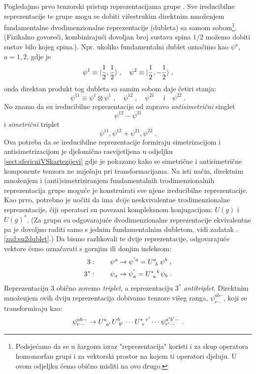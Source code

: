 Pogledajmo prvo tenzorski pristup reprezentacijama grupe .
Sve ireducibilne reprezentacije te grupe mogu se dobiti
višestrukim direktnim množenjem fundamentalne dvodimenzionalne reprezentacije
(dubleta) sa samom sobom\footnote{Podsjećamo da se u žargonu izraz
    "reprezentacija" koristi i za skup operatora homomorfan grupi i za vektorski prostor
    na kojem ti operatori djeluju. U ovom odjeljku ćemo obično
misliti na ovo drugo.}. (Fizikalno govoreći, kombinirajući dovoljan broj
sustava spina $1/2$ možemo dobiti sustav bilo kojeg spina.). Npr. ukoliko
fundamentalni dublet označimo kao
$\psi^a$, $a=1,2$, gdje je 
\begin{displaymath}
 \psi^1 \equiv | \frac{1}{2},\frac{1}{2} \rangle \;, \quad \psi^2
\equiv | \frac{1}{2}, -\frac{1}{2} \rangle \;,
\end{displaymath}
onda direktan produkt tog dubleta sa samim sobom daje četiri stanja:
\begin{displaymath}
 \psi^{11}\equiv \psi^1 \otimes \psi^1 \;, \quad \psi^{12} \;, \quad \psi^{21} \;
 \quad \text{i} \quad \psi^{22} \;.
\end{displaymath}
No znamo da su ireducibilne reprezentacije od  zapravo 
\emph{antisimetrični} singlet
\begin{displaymath}
   \psi^{12} - \psi^{21}
\end{displaymath}
i \emph{simetrični} triplet
\begin{displaymath}
 \psi^{11},  \psi^{12} + \psi^{21}, \psi^{22} \;.
\end{displaymath}
Ova potreba da se ireducibilne reprezentacije formiraju 
simetrizacijom i antisimetrizacijom je djelomično rasvijetljena
u odjeljku \ref{sect:sfericniVSkartezijevi} gdje je pokazano 
kako se simetrične i antisimetrične komponente 
tenzora ne miješaju pri transformacijama.
Na isti način, direktnim množenjem i (anti)simetriziranjem
fundamentalnih trodimenzionalnih reprezentacija grupe  moguće
je konstruirati sve njene ireducibilne reprezentacije. Kao prvo, potrebno je uočiti da
 ima \emph{dvije} neekvivalentne trodimenzionalne reprezentacije,
čiji operatori su povezani kompleksnom konjugacijom: $U(g)$ i
$U(g)^*$. (Za  grupu su odgovarajuće dvodimenzionalne reprezentacije ekvivalentne
pa je dovoljno raditi samo s jednim fundamentalnim dubletom, vidi
zadatak \thechapter.\ref{zad:su2dublet}.)
Da bismo razlikovali te dvije reprezentacije, odgovarajuće vektore
ćemo označavati s gornjim ili donjim indeksom:
\begin{align}
 3&: \qquad  \psi^a \to \psi^{'a} = \tensor{U}{^a_b} \, \psi^{b} \;, \\
 3^*&: \qquad  \psi_a \to \psi^{'}_a = \tensor{U}{^*_a^b} \, \psi_{b} \;.
\label{eq:su3fundamental}
\end{align}
Reprezentaciju 3 obično zovemo \emph{triplet}, a
reprezentaciju $3^*$ \emph{antitriplet}.
Direktnim množenjem ovih dviju  reprezentacija dobivamo 
tenzore višeg ranga, $\psi^{ab\cdots}_{r\cdots}$, koji
se transformiraju kao:
\begin{equation}
  \psi^{ab\cdots}_{r\cdots} \to 
 \tensor{U}{^{a}_{a'}} \tensor{U}{^{b}_{b'}} \cdots \tensor{U}{^*_r^{r'}} \cdots
  \psi^{a'b'\cdots}_{r'\cdots} \;.
\label{eq:mntensor}
\end{equation}

